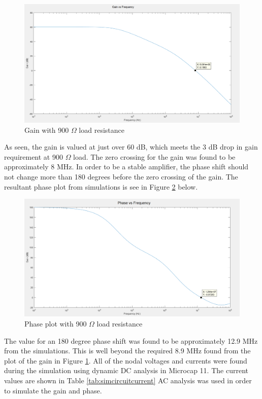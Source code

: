 \begin{figure}[H]
	\centering
	\includegraphics[width=0.7\linewidth]{CircuitDevelopment/gainfreqsim.png}
	\caption{Gain with 900 $\Omega$ load resistance}
	\label{fig:loadgain}
\end{figure}

As seen, the gain is valued at just over 60 dB, which meets the 3 dB drop in gain requirement at 900 $\Omega$ load. The zero crossing for the gain was found to be approximately 8 MHz. In order to be a stable amplifier, the phase shift should not change more than 180 degrees before the zero crossing of the gain. The resultant phase plot from simulations is see in Figure \ref{fig:phasesim} below.


\begin{figure}[H]
	\centering
	\includegraphics[width=0.7\linewidth]{CircuitDevelopment/phasefreqsim.png}
	\caption{Phase plot with 900 $\Omega$ load resistance}
	\label{fig:phasesim}
\end{figure}

The value for an 180 degree phase shift was found to be approximately 12.9 MHz from the simulations. This is well beyond the required 8.9 MHz found from the plot of the gain in Figure \ref{fig:loadgain}. All of the nodal voltages and currents were found during the simulation using dynamic DC analysis in Microcap 11. The current values are shown in Table \ref{tab:simcircuitcurrent} AC analysis was used in order to simulate the gain and phase. 


